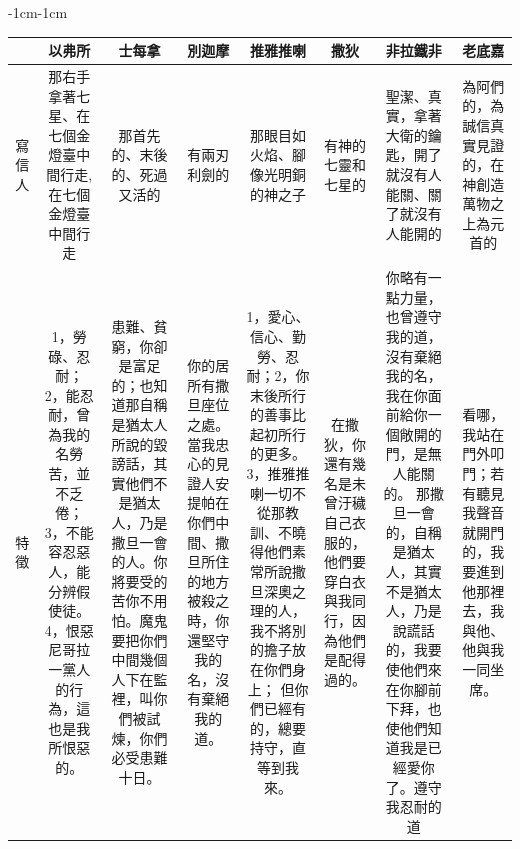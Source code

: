 \begin{changemargin}{-1cm}{-1cm}
\begin{table} %
\centering
\begin{tabular}{cccccccc}\hline
&以弗所  & 士每拿 & 別迦摩&推雅推喇 & 撒狄&非拉鐵非  & 老底嘉  \\\hline
\multicolumn{1}{m{.3cm}|}{寫信人}&
\multicolumn{1}{m{3cm}|}{那右手拿著七星、在七個金燈臺中間行走,在七個金燈臺中間行走}  &
\multicolumn{1}{m{3cm}|}{那首先的、末後的、死過又活的}  &
 \multicolumn{1}{m{3cm}|}{有兩刃利劍的} &
 \multicolumn{1}{m{4cm}|}{那眼目如火焰、腳像光明銅的神之子}  &
 \multicolumn{1}{m{3cm}|}{有神的七靈和七星的}   &
 \multicolumn{1}{m{3.6cm}|}{聖潔、真實，拿著大衛的鑰匙，開了就沒有人能關、關了就沒有人能開的}  &  
 \multicolumn{1}{m{3cm}|}{為阿們的，為誠信真實見證的，在神創造萬物之上為元首的} \\\hline
 
 
\multicolumn{1}{m{.3cm}|}{特徵}&
\multicolumn{1}{m{3cm}|}{1，勞碌、忍耐； 2，能忍耐，曾為我的名勞苦，並不乏倦； 3，不能容忍惡人，能分辨假使徒。4，恨惡尼哥拉一黨人的行為，這也是我所恨惡的。}  &
 \multicolumn{1}{m{3cm}|}{患難、貧窮，你卻是富足的；也知道那自稱是猶太人所說的毀謗話，其實他們不是猶太人，乃是撒旦一會的人。你將要受的苦你不用怕。魔鬼要把你們中間幾個人下在監裡，叫你們被試煉，你們必受患難十日。}&
 \multicolumn{1}{m{3cm}|}{你的居所有撒旦座位之處。當我忠心的見證人安提帕在你們中間、撒旦所住的地方被殺之時，你還堅守我的名，沒有棄絕我的道。}&
 \multicolumn{1}{m{4cm}|}{1，愛心、信心、勤勞、忍耐；2，你末後所行的善事比起初所行的更多。 3，推雅推喇一切不從那教訓、不曉得他們素常所說撒旦深奧之理的人，我不將別的擔子放在你們身上； 但你們已經有的，總要持守，直等到我來。}&
  \multicolumn{1}{m{3cm}|}{在撒狄，你還有幾名是未曾汙穢自己衣服的，他們要穿白衣與我同行，因為他們是配得過的。 }  &
  \multicolumn{1}{m{3.6cm}|}{你略有一點力量，也曾遵守我的道，沒有棄絕我的名，我在你面前給你一個敞開的門，是無人能關的。 那撒旦一會的，自稱是猶太人，其實不是猶太人，乃是說謊話的，我要使他們來在你腳前下拜，也使他們知道我是已經愛你了。遵守我忍耐的道}   & 
  \multicolumn{1}{m{3cm}|}{看哪，我站在門外叩門；若有聽見我聲音就開門的，我要進到他那裡去，我與他、他與我一同坐席。 }    \\\hline






\end{tabular}
\end{table}
\end{changemargin}
